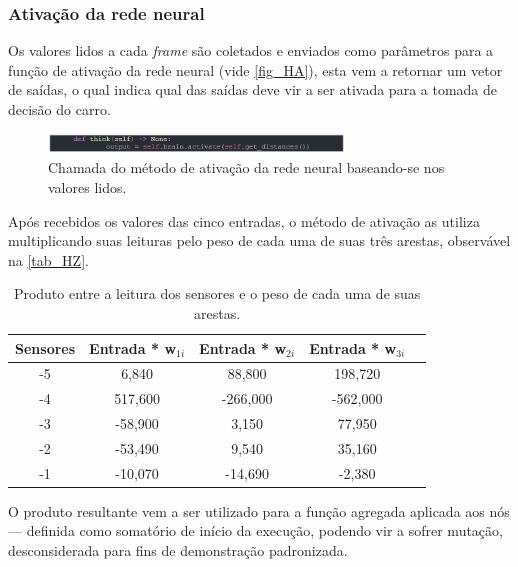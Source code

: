 \subsubsection{Ativação da rede neural}
Os valores lidos a cada \textit{frame} são coletados e enviados como parâmetros para a função de ativação da
rede neural (vide \autoref{fig_HA}), esta vem a retornar um vetor de saídas, o qual indica qual das saídas deve
vir a ser ativada para a tomada de decisão do carro.

\begin{figure}[htb]
        \centering
        \caption{\label{fig_HA}Chamada do método de ativação da rede neural baseando-se nos valores lidos.}
        \includegraphics[width=0.7\textwidth]{images/HA.png}
\end{figure}

Após recebidos os valores das cinco entradas, o método de ativação as utiliza multiplicando suas leituras
pelo peso de cada uma de suas três arestas, observável na \autoref{tab_HZ}.

\begin{table}[htb]
	\centering
    \caption{\label{tab_HZ}Produto entre a leitura dos sensores e o peso de cada uma de suas arestas.}
    \begin{tabular}{ccccc}
        \hline
		\textbf{Sensores} & \textbf{Entrada * w$_{1i}$} & \textbf{Entrada * w$_{2i}$} & \textbf{Entrada * w$_{3i}$} \\ \hline
		-5 & 6,840  & 88,800   & 198,720    \\ \hline
		-4 & 517,600  & -266,000   & -562,000    \\ \hline
		-3 & -58,900  & 3,150   & 77,950   \\ \hline
		-2 & -53,490  & 9,540   & 35,160  \\ \hline
		-1 & -10,070  & -14,690   & -2,380   \\ \hline
    \end{tabular}
    
\end{table}

O produto resultante vem a ser utilizado para a função agregada aplicada aos nós — definida como somatório de início da execução,
podendo vir a sofrer mutação, desconsiderada para fins de demonstração padronizada. 

